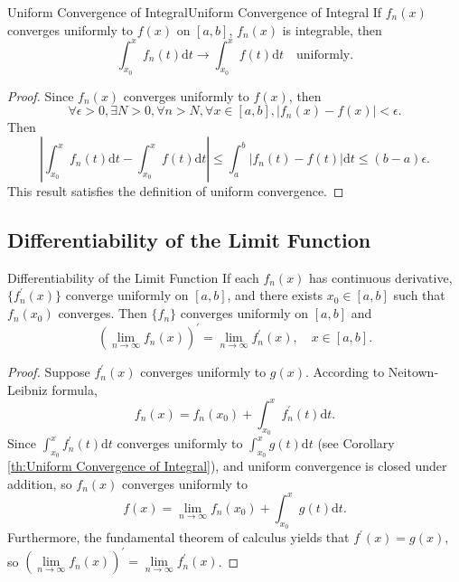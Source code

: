 \begin{corollary}{Uniform Convergence of Integral}{Uniform Convergence of Integral}
  If $f_n(x)$ converges uniformly to $f(x)$ on $[a, b]$, $f_n(x)$ is integrable,
  then
  \begin{equation}
    \int_{x_0}^x f_n(t)\mathrm{d} t \rightarrow \int_{x_0}^xf(t)\mathrm{d}t \quad
    \text{uniformly}.
  \end{equation}
\end{corollary}

\begin{proof}
  Since $f_n(x)$ converges uniformly to $f(x)$,
  then
  \begin{equation}
    \forall \epsilon > 0, \exists N > 0, \forall n > N, \forall x \in [a,b],
    |f_n(x) - f(x)| < \epsilon.
  \end{equation}
  Then
  \begin{equation}
    \left| \int_{x_0}^x f_n(t) \mathrm{d} t - \int_{x_0}^x f(t)\mathrm{d} t \right|
    \leq \int_a^b |f_n(t) - f(t)|\mathrm{d}t
    \leq (b-a)\epsilon.
  \end{equation}
  This result satisfies the definition of uniform convergence.
\end{proof}

\subsection{Differentiability of the Limit Function}

\begin{theorem}{Differentiability of the Limit Function}{}
  If each $f_n(x)$ has continuous derivative,
  $\{f_n^{\prime}(x)\}$ converge uniformly on $[a, b]$,
  and there exists $x_0 \in [a, b]$ such that $f_n(x_0)$ converges.
  Then $\{f_n\}$ converges uniformly on $[a, b]$ and
  \begin{equation}
    (\lim \limits _{n \rightarrow \infty} f_n(x))^{\prime}
    = \lim \limits _{n \rightarrow \infty} f_n^{\prime}(x), \quad x \in [a, b].
  \end{equation}
\end{theorem}

\begin{proof}
  Suppose $f_n^{\prime}(x)$ converges uniformly to $g(x)$.
  According to Neitown-Leibniz formula,
  \begin{equation}
    f_n(x) = f_n(x_0) + \int_{x_0}^x f_n^{\prime}(t)\mathrm{d}t.
  \end{equation}
  Since $\int_{x_0}^xf_n^{\prime}(t)\mathrm{d} t$ converges uniformly
  to $\int_{x_0}^xg(t)\mathrm{d} t$ (see Corollary \ref{th:Uniform Convergence of Integral}),
  and uniform convergence is closed under addition, so $f_n(x)$ converges
  uniformly to
  \begin{equation}
    f(x) = \lim \limits _{n \rightarrow \infty} f_n(x_0) + \int_{x_0}^xg(t)\mathrm{d} t.
  \end{equation}
  Furthermore, the fundamental theorem of calculus yields that $f^{\prime}(x) = g(x)$,
  so $(\lim \limits _{n \rightarrow \infty} f_n(x))^{\prime} = \lim \limits _{n \rightarrow \infty} f_n^{\prime}(x)$.
\end{proof}

